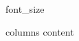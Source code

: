 \documentclass[10pt,{{ orientation }}]{article}
\begin{document}
{{ font_size }}

\begin{multicols}{ {{ columns }} }
{{ content }}
\end{multicols}
\end{document}
